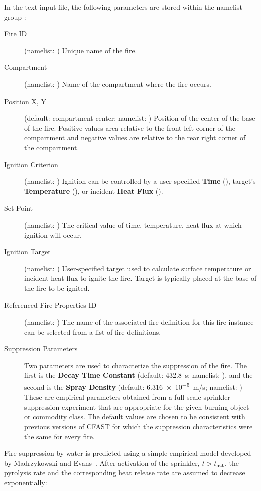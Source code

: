 {{In the text input file, the following parameters are stored within the namelist group :
\begin{description}
\item[Fire ID] (namelist: ) Unique name of the fire.
\item[Compartment] (namelist: ) Name of the compartment where the fire occurs.
\item[Position X, Y] (default: compartment center; namelist: ) Position of the center of the base of the fire. Positive values area relative to the front left corner of the compartment and negative values are relative to the rear right corner of the compartment.
\item[Ignition Criterion] (namelist: ) Ignition can be controlled by a user-specified \textbf{Time} (), target's \textbf{Temperature} (), or incident \textbf{Heat Flux} ().
\item[Set Point] (namelist: ) The critical value of time, temperature, heat flux at which ignition will occur.
\item[Ignition Target] (namelist: ) User-specified target used to calculate surface temperature or incident heat flux to ignite the fire. Target is typically placed at the base of the fire to be ignited.
\item[Referenced Fire Properties ID] (namelist: ) The name of the associated fire definition for this fire instance can be selected from a list of fire definitions.
\item[Suppression Parameters] Two parameters are used to characterize the suppression of the fire. The first is the \textbf{Decay Time Constant} (default: 432.8~s; namelist: ), and the second is the \textbf{Spray Density} (default: \num{6.316e-5}~m/s; namelist: ) These are empirical parameters obtained from a full-scale sprinkler suppression experiment that are appropriate for the given burning object or commodity class. The default values are chosen to be consistent with previous versions of CFAST for which the suppression characteristics were the same for every fire.
\end{description}
Fire suppression by water is predicted using a simple empirical model developed by Madrzykowski \cite{Madrzykowski:1992} and Evans~\cite{Evans:1993}. After activation of the sprinkler, $t > t_{\rm act}$, the pyrolysis rate and the corresponding heat release rate are assumed to decrease exponentially:
}}
